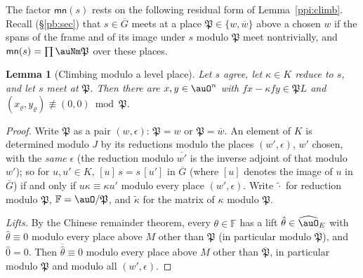 \documentclass[10pt]{amsart}
\newtheorem{lemma}[theorem]{Lemma}
\theoremstyle{definition}
\theoremstyle{remark}
\providecommand{\auG}{\overline G}
\providecommand{\aubar}[1]{\overline{#1}}
\begin{document}
The factor $\mathsf{mn}(s)$ rests on the following residual form of Lemma~\ref{ppi:climb}. Recall
(\S\ref{pb:sec}) that $s\in\auG$ meets at a place $\mathfrak P\in\{w,\aubar w\}$ above a chosen $w$ if
the spans of the frame and of its image under $s$ modulo $\mathfrak P$ meet nontrivially, and
$\mathsf{mn}(s)=\prod\auNm\mathfrak P$ over these places.

\begin{lemma}[Climbing modulo a level place]\label{pbg:climbp}
Let $s$ agree, let $\kappa\in K$ reduce to $s$, and let $s$ meet at $\mathfrak P$. Then there are $x,y\in
\auO^n$ with $fx-\kappa fy\in\mathfrak PL$ and $(x_\varrho,y_\varrho)\not\equiv(0,0)\bmod\mathfrak P$.
\end{lemma}

\begin{proof}
Write $\mathfrak P$ as a pair $(w,\epsilon)$: $\mathfrak P=w$ or $\mathfrak P=\aubar w$. An element of
$K$ is determined modulo $J$ by its reductions modulo the places $(w',\epsilon)$, $w'$ chosen, with the
\emph{same} $\epsilon$ (the reduction modulo $\aubar{w'}$ is the inverse adjoint of that modulo $w'$);
so for $u,u'\in K$, $[u]\,s=s\,[u']$ in $\auG$ (where $[u]$ denotes the image of $u$ in $\auG$) if and only if $u\kappa\equiv \kappa u'$ modulo every place
$(w',\epsilon)$. Write $\tilde\cdot$ for reduction modulo $\mathfrak P$, $\mathbb F=\auO/\mathfrak P$, and
$\tilde\kappa$ for the matrix of $\kappa$ modulo $\mathfrak P$.

\emph{Lifts.} By the Chinese remainder theorem, every $\theta\in\mathbb F$ has a lift $\hat\theta\in
\widehat\auO_E$ with $\hat\theta\equiv0$ modulo every place above $M$ other than $\mathfrak P$ (in
particular modulo $\aubar{\mathfrak P}$), and $\hat0=0$. Then $\aubar{\hat\theta}\equiv0$ modulo every
place above $M$ other than $\aubar{\mathfrak P}$, in particular modulo $\mathfrak P$ and modulo all
$(w',\epsilon)$.


\end{proof}
\end{document}
